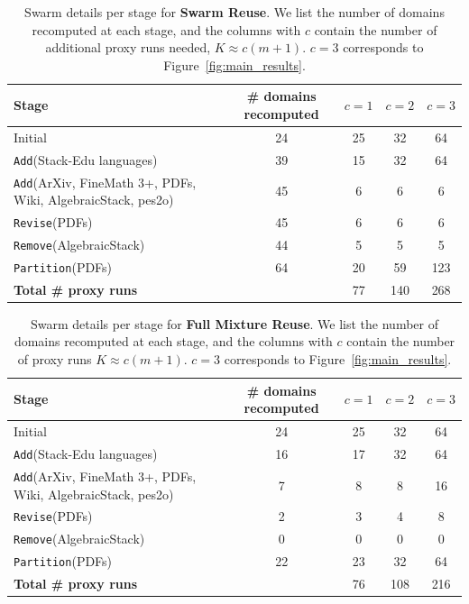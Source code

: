 \documentclass[table]{ai2style/ai2}
\newcommand{\Add}[0]{\texttt{Add}\xspace}
\newcommand{\Remove}[0]{\texttt{Remove}\xspace}
\newcommand{\Partition}[0]{\texttt{Partition}\xspace}
\newcommand{\Revise}[0]{\texttt{Revise}\xspace}
\begin{document}
\begin{table}[!h]
\centering
\caption{Swarm details per stage for \textbf{Swarm Reuse}. We list the number of domains recomputed at each stage, and the columns with $c$ contain the number of additional proxy runs needed, $K \approx c(m+1)$. $c=3$ corresponds to Figure~\ref{fig:main_results}.}
\footnotesize
\setlength{\tabcolsep}{6pt}
\begin{tabular}{lcccc}
\toprule
\textbf{Stage} & \textbf{\# domains recomputed} & \textbf{$c=1$} & \textbf{$c=2$} & \textbf{$c=3$} \\
\midrule
Initial      & 24 & 25 & 32 & 64 \\
\Add (Stack-Edu languages)  & 39 & 15 & 32 & 64 \\
\Add (ArXiv, FineMath 3+, PDFs, Wiki, AlgebraicStack, pes2o) & 45 & 6 & 6 & 6 \\
\Revise (PDFs) & 45 & 6 & 6 & 6 \\
\Remove (AlgebraicStack) & 44 & 5 & 5 & 5 \\
\Partition (PDFs) & 64 & 20 & 59 & 123 \\
\midrule
\textbf{Total \# proxy runs} & & 77 & 140 & 268 \\
\bottomrule
\end{tabular}
\label{tab:cost_swarmreuse}
\end{table}

\begin{table}[!h]
\centering
\caption{Swarm details per stage for \textbf{Full Mixture Reuse}. We list the number of domains recomputed at each stage, and the columns with $c$ contain the number of proxy runs $K \approx c(m+1)$. $c=3$ corresponds to Figure~\ref{fig:main_results}.}
\footnotesize
\setlength{\tabcolsep}{6pt}
\begin{tabular}{lcccc}
\toprule
\textbf{Stage} & \textbf{\# domains recomputed} & \textbf{$c=1$} & \textbf{$c=2$} & \textbf{$c=3$} \\
\midrule
Initial      & 24 & 25 & 32 & 64 \\
\Add (Stack-Edu languages)  & 16 & 17 & 32 & 64 \\
\Add (ArXiv, FineMath 3+, PDFs, Wiki, AlgebraicStack, pes2o) & 7 & 8 & 8 & 16 \\
\Revise (PDFs) & 2 & 3 & 4 & 8 \\
\Remove (AlgebraicStack) & 0 & 0 & 0 & 0 \\
\Partition (PDFs) & 22 & 23 & 32 & 64 \\
\midrule
\textbf{Total \# proxy runs} &  & 76 & 108 & 216 \\
\bottomrule
\end{tabular}
\label{tab:cost_fullreuse}
\end{table}
\end{document}
